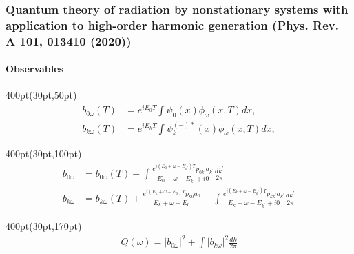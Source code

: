 \begin{frame}
\frametitle{Quantum theory of radiation by nonstationary systems 
	with application to high-order harmonic generation
        (Phys. Rev. A 101, 013410 (2020))}
	\framesubtitle{Observables}





\begin{textblock*}{400pt}(30pt,50pt)
\footnotesize
\begin{align}
b_{0\omega}(T) & = e^{iE_0T} \int \psi_0(x) \phi_\omega(x,T) dx,      \\
b_{k\omega}(T) & = e^{iE_kT} \int \psi_k^{(-)*}(x) \phi_\omega(x,T) dx, 
\end{align}
\end{textblock*}



\begin{textblock*}{400pt}(30pt,100pt)
\footnotesize
\begin{align}
b_{0\omega} & = b_{0\omega}(T)
 +\int\frac{e^{i(E_0+\omega-E_{k^\prime})T}p_{0k^\prime}a_{k^\prime}}
{E_0+\omega-E_{k^\prime} + i0} \frac{dk^\prime}{2\pi} \\
b_{k\omega} & = b_{k\omega}(T)
 +\frac{e^{i(E_k+\omega-E_0)T}p_{k0}a_0}{E_k+\omega-E_0}
 +\int\frac{e^{i(E_k+\omega-E_{k^\prime})T}p_{kk^\prime}a_{k^\prime}}
{E_k+\omega-E_{k^\prime} + i0} \frac{dk^\prime}{2\pi} 
\end{align}
\end{textblock*}


\begin{textblock*}{400pt}(30pt,170pt)
\footnotesize
\begin{align}
  Q(\omega) = \left| b_{0\omega}\right|^2 
        + \int \left| b_{k\omega}\right|^2 \frac{dk}{2\pi} 
\end{align}
\end{textblock*}

\end{frame}






